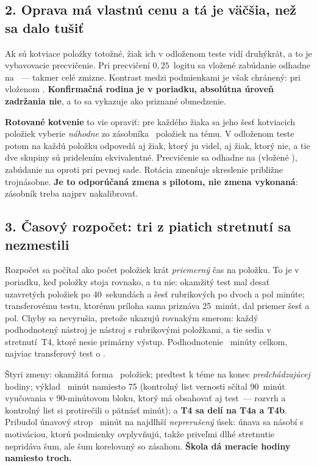 \documentclass[9.5pt,a4paper]{article}
\begin{document}
\subsection{2. Oprava má vlastnú cenu a tá je väčšia, než sa dalo tušiť}

Ak sú kotviace položky totožné, žiak ich v odloženom teste vidí druhýkrát, a to
je vybavovacie precvičenie. Pri precvičení $0{,}25$~logitu sa vložené zabúdanie
\asmEqPlanted{} odhadne na \asmTeForgetting{}~--- takmer celé zmizne. Kontrast
medzi podmienkami je však chránený: \asmTeContrast{} pri vloženom
\asmTeContrastPlanted{}. \textbf{Konfirmačná rodina je v poriadku, absolútna
úroveň zadržania nie}, a to sa vykazuje ako priznané obmedzenie.

\textbf{Rotované kotvenie} to vie opraviť: pre každého žiaka sa jeho šesť
kotviacich položiek vyberie \emph{náhodne} zo zásobníka \asmRotPool{}~položiek
na tému. V odloženom teste potom na každú položku odpovedá aj žiak, ktorý ju
videl, aj žiak, ktorý nie, a tie dve skupiny sú pridelením ekvivalentné.
Precvičenie sa odhadne na \asmRotPractice{} (vložené \asmRotPracticePlanted{}),
zabúdanie na \asmRotForgetting{} oproti \asmFixForgetting{} pri pevnej sade.
Rotácia zmenšuje skreslenie približne trojnásobne. \textbf{Je to odporúčaná
zmena s pilotom, nie zmena vykonaná}: zásobník treba najprv nakalibrovať.

\subsection{3. Časový rozpočet: tri z piatich stretnutí sa nezmestili}

Rozpočet sa počítal ako počet položiek krát \emph{priemerný} čas na položku. To
je v poriadku, keď položky stoja rovnako, a tu nie: okamžitý test mal desať
uzavretých položiek po 40~sekundách a šesť rubrikových po dvoch a pol minúte;
transferovému testu, ktorému príloha sama priznáva 25~minút, dal priemer šesť a
pol. Chyby sa nevyrušia, pretože ukazujú rovnakým smerom: každý podhodnotený
nástroj je nástroj s rubrikovými položkami, a tie sedia v stretnutí~T4, ktoré
nesie primárny výstup. Podhodnotenie \asmBudgetUnderstated{}~minúty celkom,
najviac transferový test o \asmBudgetWorstBy{}.

Štyri zmeny: okamžitá forma \asmFormItems{}~položiek; predtest k téme na konec
\emph{predchádzajúcej} hodiny; výklad \instrLessonMin{}~minút namiesto 75
(kontrolný list vernosti sčítal 90~minút vyučovania v 90-minútovom bloku, ktorý
má obsahovať aj test~--- rozvrh a kontrolný list si protirečili o pätnásť minút);
a \textbf{T4 sa delí na T4a a T4b}. Pribudol únavový strop
\instrFatigueCap{}~minút na najdlhší \emph{neprerušený} úsek: únava sa násobí s
motiváciou, ktorú podmienky ovplyvňujú, takže priveľmi dlhé stretnutie nepridáva
šum, ale šum korelovaný so zásahom. \textbf{Škola dá \asmMeasureLessons{}
meracie hodiny namiesto troch.}
\end{document}
